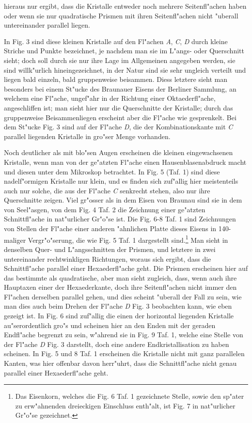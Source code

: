 \documentclass[a4paper, 11pt, oneside]{article}
\begin{document}
hieraus nur ergibt, dass die Kristalle entweder noch mehrere Seitenfl"achen haben oder wenn sie nur quadratische Prismen mit ihren Seitenfl"achen nicht "uberall untereinander parallel liegen.

In Fig. 3 sind diese kleinen Kristalle auf den Fl"achen \emph{A}, \emph{C}, \emph{D} durch kleine Striche und Punkte bezeichnet, je nachdem man sie im L"angs- oder Querschnitt sieht; doch soll durch sie nur ihre Lage im Allgemeinen angegeben werden, sie sind willk"urlich hineingezeichnet, in der Natur sind sie sehr ungleich verteilt und liegen bald einzeln, bald gruppenweise beisammen. Diess letztere sieht man besonders bei einem St"ucke des Braunauer Eisens der Berliner Sammlung, an welchem eine Fl"ache, ungef"ahr in der Richtung einer Oktaederfl"ache, angeschliffen ist; man sieht hier nur die Querschnitte der Kristalle; durch das gruppenweise Beisammenliegen erscheint aber die Fl"ache wie gesprenkelt. Bei dem St"ucke Fig. 3 sind auf der Fl"ache \emph{D}, die der Kombinationskante mit \emph{C} parallel liegenden Kristalle in gro"ser Menge vorhanden.

Noch deutlicher als mit blo"sen Augen erscheinen die kleinen eingewachsenen Kristalle, wenn man von der ge"atzten Fl"ache einen Hausenblasenabdruck macht und diesen unter dem Mikroskop betrachtet. In Fig. 5 (Taf. 1) sind diese nadelf"ormigen Kristalle nur klein, und es finden sich zuf"allig hier meistenteils auch nur solche, die aus der Fl"ache \emph{C} senkrecht stehen, also nur ihre Querschnitte zeigen. Viel gr"osser als in dem Eisen von Braunau sind sie in dem von Seel"asgen, von dem Fig. 4 Taf. 2 die Zeichnung einer ge"atzten Schnittfl"ache in nat"urlicher Gr"o"se ist. Die Fig. 6-8 Taf. 1 sind Zeichnungen von Stellen der Fl"ache einer anderen "ahnlichen Platte dieses Eisens in 140-maliger Vergr"o"serung, die wie Fig. 5 Taf. 1 dargestellt sind.\footnote{Das Eisenkorn, welches die Fig. 6 Taf. 1 gezeichnete Stelle, sowie den sp"ater zu erw"ahnenden dreieckigen Einschluss enth"alt, ist Fig. 7 in nat"urlicher Gr"o"se gezeichnet.} Man sieht in denselben Quer- und L"angsschnitten der Prismen, und letztere in zwei untereinander rechtwinkligen Richtungen, woraus sich ergibt, dass die Schnittfl"ache parallel einer Hexaederfl"ache geht. Die Prismen erscheinen hier auf das bestimmte als quadratische, aber man sieht zugleich, dass, wenn auch ihre Hauptaxen einer der Hexaederkante, doch ihre Seitenfl"achen nicht immer den Fl"achen derselben parallel gehen, und dies scheint "uberall der Fall zu sein, wie man dies auch beim Drehen der Fl"ache \emph{D} Fig. 3 beobachten kann, wie eben gezeigt ist. In Fig. 6 sind zuf"allig die einen der horizontal liegenden Kristalle au"serordentlich gro"s und scheinen hier an den Enden mit der geraden Endfl"ache begrenzt zu sein, w"ahrend sie in Fig. 9 Taf. 1, welche eine Stelle von der Fl"ache \emph{D} Fig. 3 darstellt, doch eine andere Endkristallisation zu haben scheinen. In Fig. 5 und 8 Taf. 1 erscheinen die Kristalle nicht mit ganz parallelen Kanten, was hier offenbar davon herr"uhrt, dass die Schnittfl"ache nicht genau parallel einer Hexaederfl"ache geht.
\end{document}
